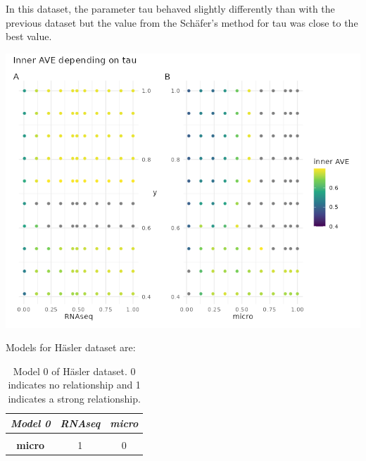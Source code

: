 \documentclass[
  12pt,
  a4paper,
  twoside,
  openright]{book}
\let\origfigure\figure
\let\endorigfigure\endfigure
\renewenvironment{figure}[1][2] {
    \expandafter\origfigure\expandafter[!htp]
} {
    \endorigfigure
}
\begin{document}
In this dataset, the parameter tau behaved slightly differently than with the previous dataset but the value from the Schäfer's method for tau was close to the best value.

\begin{figure}
\includegraphics[width=1\linewidth]{images/hasler-centroid_tau} \caption[Tau effect on inner AVE in the Häsler's dataset.]{Changes on tau on the centroid scheme in the Häsler dataset affect the inner AVE score on the model 1. The panel A shows on the ordinate the RNAseq tau value, the panel B on the right, shows the tau of the microorganism; both of them show the y's tau on the abscissa.}\label{fig:hasler-tau}
\end{figure}

Models for Häsler dataset are:

\begin{table}[H]

\caption[Model 0 of Häsler dataset.]{\label{tab:hasler-model-0}Model 0 of Häsler dataset. 0 indicates no relationship and 1 indicates a strong relationship.}
\centering
\begin{tabular}[t]{|>{}c|c|>{}c|}
\hline
\em{\textbf{Model 0}} & \em{\textbf{RNAseq}} & \em{\textbf{micro}}\\
\hline
\textbf{\cellcolor{gray!6}{RNAseq}} & \cellcolor{gray!6}{0} & \cellcolor{gray!6}{1}\\
\hline
\textbf{micro} & 1 & 0\\
\hline
\end{tabular}
\end{table}
\end{document}

